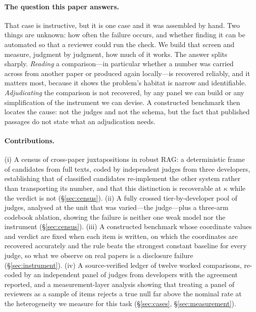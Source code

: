 \documentclass[11pt]{article}
\begin{document}
\paragraph{The question this paper answers.}
That case is instructive, but it is one case and it was assembled by hand. Two
things are unknown: how often the failure occurs, and whether finding it can be
automated so that a reviewer could run the check. We build that screen and
measure, judgment by judgment, how much of it works. The answer splits sharply.
\emph{Reading} a comparison---in particular whether a number was carried across
from another paper or produced again locally---is recovered reliably, and it
matters most, because it shows the problem's habitat is narrow and identifiable.
\emph{Adjudicating} the comparison is not recovered, by any panel we can build
or any simplification of the instrument we can devise. A constructed benchmark
then locates the cause: not the judges and not the schema, but the fact that
published passages do not state what an adjudication needs.

\paragraph{Contributions.}
(i) A census of cross-paper juxtapositions in robust RAG: a deterministic frame
of \FrameCandidates{} candidates from \FrameScreened{} full texts, coded by
independent judges from three developers, establishing that
\ProvReimplemented{} of \ProvClassified{} classified candidates re-implement the
other system rather than transporting its number, and that this distinction is
recoverable at $\kappa$ \DecProvK{} while the verdict is not
(\S\ref{sec:census}).
(ii) A fully crossed tier-by-developer pool of \TierPanelN{} judges, analysed at
the unit that was varied---the judge---plus a three-arm codebook ablation,
showing the failure is neither one weak model nor the instrument
(\S\ref{sec:census}).
(iii) A constructed benchmark whose coordinate values and verdict are fixed when
each item is written, on which the coordinates are recovered accurately and the
rule beats the strongest constant baseline for every judge, so what we observe
on real papers is a disclosure failure (\S\ref{sec:instrument}).
(iv) A source-verified ledger of twelve worked comparisons, re-coded by an
independent panel of \RecJudges{} judges from \RecDevs{} developers with the
agreement reported, and a measurement-layer analysis showing that treating a
panel of reviewers as a sample of items rejects a true null far above the
nominal rate at the heterogeneity we measure for this task
(\S\ref{sec:cases}, \S\ref{sec:measurement}).
\end{document}
